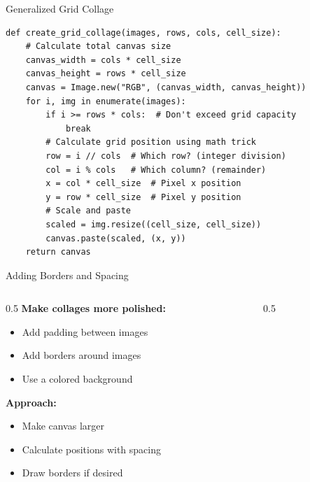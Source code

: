 \documentclass{csbeamer}
\begin{document}
\begin{frame}[fragile]{Generalized Grid Collage}
    \begin{lstlisting}
def create_grid_collage(images, rows, cols, cell_size):
    # Calculate total canvas size
    canvas_width = cols * cell_size
    canvas_height = rows * cell_size
    canvas = Image.new("RGB", (canvas_width, canvas_height))
    for i, img in enumerate(images):
        if i >= rows * cols:  # Don't exceed grid capacity
            break
        # Calculate grid position using math trick
        row = i // cols  # Which row? (integer division)
        col = i % cols   # Which column? (remainder)
        x = col * cell_size  # Pixel x position
        y = row * cell_size  # Pixel y position
        # Scale and paste
        scaled = img.resize((cell_size, cell_size))
        canvas.paste(scaled, (x, y))
    return canvas
    \end{lstlisting}
\end{frame}

\begin{frame}{Adding Borders and Spacing}
    \begin{columns}
    \begin{column}{0.5\textwidth}
        \textbf{Make collages more polished:}
        \begin{itemize}
            \item Add padding between images
            \item Add borders around images
            \item Use a colored background
        \end{itemize}

        \vspace{1em}

        \textbf{Approach:}
        \begin{itemize}
            \item Make canvas larger
            \item Calculate positions with spacing
            \item Draw borders if desired
        \end{itemize}
    \end{column}
    \begin{column}{0.5\textwidth}
    \end{column}
    \end{columns}
\end{frame}
\end{document}
